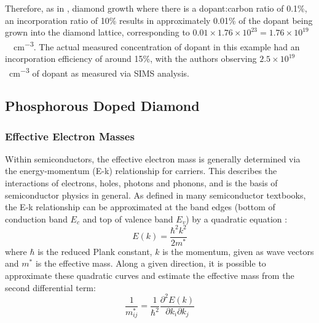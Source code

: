 \begin{refsection}
Therefore, as in \cite{koizumi1997}, diamond growth where there is a dopant:carbon ratio of 0.1\%, an incorporation ratio of 10\% results in approximately 0.01\% of the dopant being grown into the diamond lattice, corresponding to $0.01\times1.76\times10^{23}=1.76\times10^{19}$~\si{\atoms\per\centi\metre\cubed}. The actual measured concentration of dopant in this example had an incorporation efficiency of around 15\%, with the authors observing $2.5\times10^{19}$ \si{\atoms\per\centi\metre\cubed} of dopant as measured via SIMS analysis. 

\subsection{Phosphorous Doped Diamond}
\subsubsection{Effective Electron Masses}
\label{subsubsec:effective_electron_masses_in_phosphorous_doped_diamond}
Within semiconductors, the effective electron mass is generally determined via the energy-momentum (E-k) relationship for carriers. This describes the interactions of electrons, holes, photons and phonons, and is the basis of semiconductor physics in general. As defined in many semiconductor textbooks, the E-k relationship can be approximated at the band edges (bottom of conduction band $E_{c}$ and top of valence band $E_{v}$) by a quadratic equation \cite{sze2006, Schroder2006-sx, Yu2010, Singleton2001-um}:
\begin{equation}
    E(k) = \frac{\hbar^{2}k^{2}}{2m^{*}}
\end{equation}
where $\hbar$ is the reduced Plank constant, $k$ is the momentum, given as wave vectors and $m^{*}$ is the effective mass. Along a given direction, it is possible to approximate these quadratic curves and estimate the effective mass from the second differential term:
\begin{equation}
    \frac{1}{m_{ij}^{*}} = \frac{1}{\hbar^{2}}\frac{\partial^{2} E(k)}{\partial k_{i}\partial k_{j}}
\end{equation}

\end{refsection}
